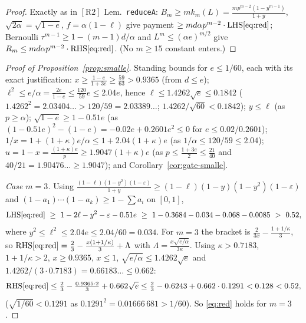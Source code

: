\documentclass[11pt]{amsart}
\newcommand{\eps}{\varepsilon}
\newcommand{\RII}{[\textrm{R2}]}
\begin{document}
\begin{proof}
Exactly as in $\RII$ Lem.~\texttt{reduceA}:
$B_m\ge mk_m(L)=\frac{mp^{m-2}(1-y^{m-1})}{1+y}$, $\sqrt{2\alpha}=\sqrt{1-e}$,
$f=\alpha(1-\ell)$ give payment $\ge md\alpha p^{m-2}\cdot\mathrm{LHS}\eqref{eq:red}$;
Bernoulli $\tau^{m-1}\ge1-(m-1)d/\alpha$ and $L^m\le(\alpha e)^{m/2}$ give
$R_m\le md\alpha p^{m-2}\cdot\mathrm{RHS}\eqref{eq:red}$.
(No $m\ge15$ constant enters.)
\end{proof}

\begin{proof}[Proof of Proposition~\ref{prop:smalle}]
Standing bounds for $e\le1/60$, each with its exact justification:
$x\ge\tfrac{1-e}{1+3e}\ge\tfrac{59}{63}>0.9365$ (from $d\le e$);
$\ell^2\le e/\alpha=\tfrac{2e}{1-e}\le\tfrac{120}{59}e\le2.04e$, hence
$\ell\le1.4262\sqrt e\le0.1842$
($1.4262^2=2.03404\ldots>120/59=2.03389\ldots$; $1.4262/\sqrt{60}<0.1842$);
$y\le\ell$ (as $p\ge\alpha$); $\sqrt{1-e}\ge1-0.51e$
(as $(1-0.51e)^2-(1-e)=-0.02e+0.2601e^2\le0$ for $e\le0.02/0.2601$);
$1/x=1+(1+\kappa)e/\alpha\le1+2.04(1+\kappa)e$ (as $1/\alpha\le120/59\le2.04$);
$u=1-x=\tfrac{(1+\kappa)e}{p}\ge1.9047(1+\kappa)e$
(as $p\le\tfrac{1+3e}2\le\tfrac{21}{40}$ and $40/21=1.90476\ldots\ge1.9047$);
and Corollary~\ref{cor:gate-smalle}.

\emph{Case $m=3$.}  Using
$\frac{(1-\ell)(1-y^2)(1-\eps)}{1+y}\ge(1-\ell)(1-y)(1-y^2)(1-\eps)$ and
$(1-a_1)\cdots(1-a_k)\ge1-\sum a_i$ on $[0,1]$,
\[
 \mathrm{LHS}\eqref{eq:red}\ \ge\ 1-2\ell-y^2-\eps-0.51e
 \ \ge\ 1-0.3684-0.034-0.068-0.0085\ >\ 0.52,
\]
where $y^2\le\ell^2\le2.04e\le2.04/60=0.034$.  For $m=3$ the bracket is
$\tfrac{2}{3x}-\tfrac{1+1/\kappa}3$, so
$\mathrm{RHS}\eqref{eq:red}=\tfrac23-\tfrac{x(1+1/\kappa)}3+\Lambda$ with
$\Lambda=\tfrac{x\sqrt{e/\alpha}}{3\kappa}$.  Using $\kappa>0.7183$,
$1+1/\kappa>2$, $x\ge0.9365$, $x\le1$, $\sqrt{e/\alpha}\le1.4262\sqrt e$ and
$1.4262/(3\cdot0.7183)=0.66183\ldots\le0.662$:
\[
 \mathrm{RHS}\eqref{eq:red}\le\tfrac23-\tfrac{0.9365\cdot2}{3}+0.662\sqrt e
 \le\tfrac23-0.6243+0.662\cdot0.1291<0.128<0.52,
\]
($\sqrt{1/60}<0.1291$ as $0.1291^2=0.01666\,681>1/60$).  So \eqref{eq:red}
holds for $m=3$.


\end{proof}
\end{document}
